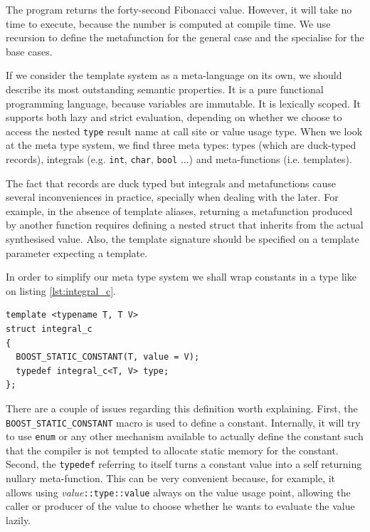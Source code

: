 The program returns the forty-second Fibonacci value. However, it will
take no time to execute, because the number is computed at compile
time. We use recursion to define the metafunction for the general case
and the specialise for the base cases.

If we consider the template system as a meta-language on its own, we
should describe its most outstanding semantic properties. It is a pure
functional programming language, because variables are immutable. It
is lexically scoped. It supports both lazy and strict evaluation,
depending on whether we choose to access the nested \texttt{type}
result name at call site or value usage type. When we look at the meta
type system, we find three meta types: types (which are duck-typed
records), integrals (e.g. \texttt{int}, \texttt{char}, \texttt{bool}
...) and meta-functions (i.e. templates).

The fact that records are duck typed but integrals and metafunctions
cause several inconveniences in practice, specially when dealing with
the later. For example, in the absence of template aliases, returning
a metafunction produced by another function requires defining a nested
struct that inherits from the actual synthesised value. Also, the
template signature should be specified on a template parameter
expecting a template.

In order to simplify our meta type system we shall wrap constants in a
type like on listing \ref{lst:integral_c}.

\begin{lstlisting}[float, 
  caption=Integral constant nullary metafunction  wrapper.,
  label=lst:integral_c]
template <typename T, T V>
struct integral_c
{
  BOOST_STATIC_CONSTANT(T, value = V);
  typedef integral_c<T, V> type;
};
\end{lstlisting}

There are a couple of issues regarding this definition worth
explaining. First, the \texttt{BOOST\_STATIC\_CONSTANT} macro is used
to define a constant. Internally, it will try to use \texttt{enum} or
any other mechanism available to actually define the constant such
that the compiler is not tempted to allocate static memory for the
constant. Second, the \texttt{typedef} referring to itself turns a
constant value into a self returning nullary meta-function. This can
be very convenient because, for example, it allows using
\emph{value}\texttt{::type::value} always on the value usage point,
allowing the caller or producer of the value to choose whether he
wants to evaluate the value lazily.

